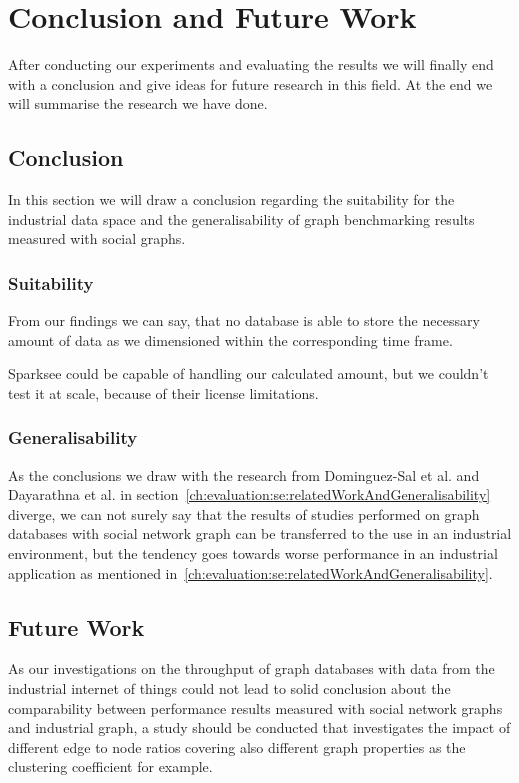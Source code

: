\chapter{Conclusion and Future Work}
\label{ch:futureWork}
After conducting our experiments and evaluating the results we will finally end with a conclusion and give ideas for future research in this field.
At the end we will summarise the research we have done.

\section{Conclusion}
\label{ch:futureWork:se:conclusion}
In this section we will draw a conclusion regarding the suitability for the industrial data space and the generalisability of graph benchmarking results measured with social graphs.

\subsection{Suitability}
From our findings we can say,
that no database is able to store the necessary amount of data as we dimensioned within the corresponding time frame.

Sparksee could be capable of handling our calculated amount,
but we couldn't test it at scale,
because of their license limitations.

\subsection{Generalisability}
As the conclusions we draw with the research from Dominguez-Sal et al.\cite{TaoShen} and Dayarathna et al.\cite{Dayarathna2012} in section~\ref{ch:evaluation:se:relatedWorkAndGeneralisability} diverge,
we can not surely say that the results of studies performed on graph databases with social network graph can be transferred to the use in an industrial environment,
but the tendency goes towards worse performance in an industrial application as mentioned in~\ref{ch:evaluation:se:relatedWorkAndGeneralisability}.

\section{Future Work}
As our investigations on the throughput of graph databases with data from the industrial internet of things could not lead to solid conclusion about the comparability between performance results measured with social network graphs and industrial graph,
a study should be conducted that investigates the impact of different edge to node ratios covering also different graph properties as the clustering coefficient for example.

